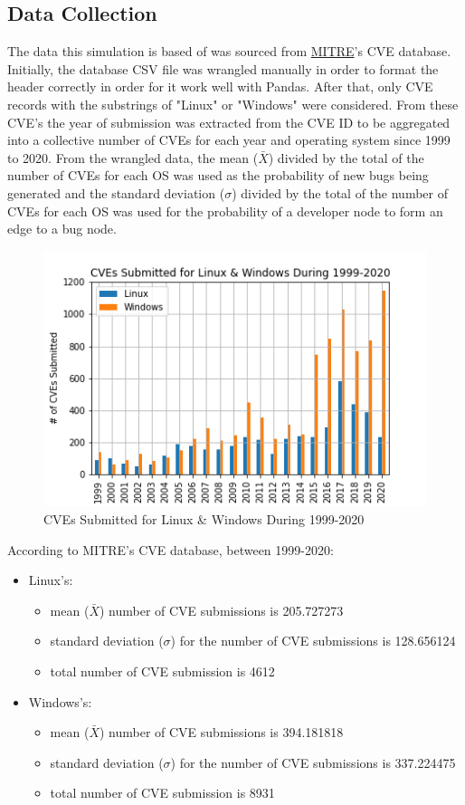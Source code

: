 \documentclass[10pt, a4paper, fleqn]{article}
\begin{document}
\subsection{Data Collection}
The data this simulation is based of was sourced from \href{https://cve.mitre.org/data/downloads/index.html}{MITRE}'s CVE database. Initially, the database CSV file was wrangled manually in order to format the header correctly in order for it work well with Pandas. After that, only CVE records with the substrings of "Linux" or "Windows" were considered. From these CVE's the year of submission was extracted from the CVE ID to be aggregated into a collective number of CVEs for each year and operating system since 1999 to 2020. From the wrangled data, the mean ($\bar{X}$) divided by the total of the number of CVEs for each OS was used as the probability of new bugs being generated and the standard deviation ($\sigma$) divided by the total of the number of CVEs for each OS was used for the probability of a developer node to form an edge to a bug node.
\begin{figure}[hbt!]
	\centering
	\includegraphics[scale=0.6]{base_data.png}
	\caption{CVEs Submitted for Linux \& Windows During 1999-2020}
\end{figure}
According to MITRE's CVE database, between 1999-2020:
\begin{itemize}
	\item Linux's:
	\begin{itemize}
		\item mean ($\bar{X}$) number of CVE submissions is 205.727273
		\item standard deviation ($\sigma$) for the number of CVE submissions is 128.656124
		\item total number of CVE submission is 4612
	\end{itemize}
	\item Windows's:
	\begin{itemize}
		\item mean ($\bar{X}$) number of CVE submissions is 394.181818
		\item standard deviation ($\sigma$) for the number of CVE submissions is 337.224475
		\item total number of CVE submission is 8931
	\end{itemize}
\end{itemize}
\end{document}
